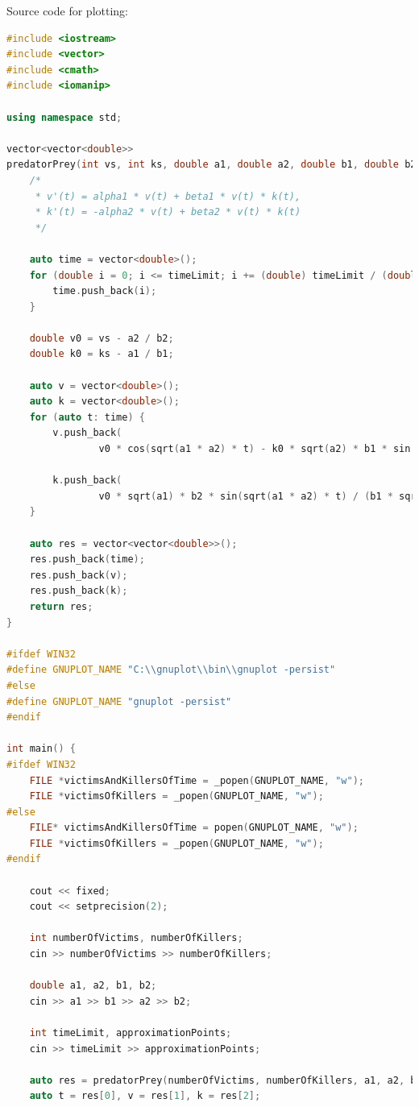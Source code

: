\documentclass{article}
\begin{document}
Source code for plotting: \\ 
\begin{lstlisting}[language=C++]
#include <iostream>
#include <vector>
#include <cmath>
#include <iomanip>

using namespace std;

vector<vector<double>>
predatorPrey(int vs, int ks, double a1, double a2, double b1, double b2, int timeLimit, int approximation) {
    /*
     * v'(t) = alpha1 * v(t) + beta1 * v(t) * k(t),
     * k'(t) = -alpha2 * v(t) + beta2 * v(t) * k(t)
     */

    auto time = vector<double>();
    for (double i = 0; i <= timeLimit; i += (double) timeLimit / (double) approximation) {
        time.push_back(i);
    }

    double v0 = vs - a2 / b2;
    double k0 = ks - a1 / b1;

    auto v = vector<double>();
    auto k = vector<double>();
    for (auto t: time) {
        v.push_back(
                v0 * cos(sqrt(a1 * a2) * t) - k0 * sqrt(a2) * b1 * sin(sqrt(a1 * a2) * t) / (b2 * sqrt(a1)) + a2 / b2);

        k.push_back(
                v0 * sqrt(a1) * b2 * sin(sqrt(a1 * a2) * t) / (b1 * sqrt(a2)) + k0 * cos(sqrt(a1 * a2) * t) + a1 / b1);
    }

    auto res = vector<vector<double>>();
    res.push_back(time);
    res.push_back(v);
    res.push_back(k);
    return res;
}

#ifdef WIN32
#define GNUPLOT_NAME "C:\\gnuplot\\bin\\gnuplot -persist"
#else
#define GNUPLOT_NAME "gnuplot -persist"
#endif

int main() {
#ifdef WIN32
    FILE *victimsAndKillersOfTime = _popen(GNUPLOT_NAME, "w");
    FILE *victimsOfKillers = _popen(GNUPLOT_NAME, "w");
#else
    FILE* victimsAndKillersOfTime = popen(GNUPLOT_NAME, "w");
    FILE *victimsOfKillers = _popen(GNUPLOT_NAME, "w");
#endif

    cout << fixed;
    cout << setprecision(2);

    int numberOfVictims, numberOfKillers;
    cin >> numberOfVictims >> numberOfKillers;

    double a1, a2, b1, b2;
    cin >> a1 >> b1 >> a2 >> b2;

    int timeLimit, approximationPoints;
    cin >> timeLimit >> approximationPoints;

    auto res = predatorPrey(numberOfVictims, numberOfKillers, a1, a2, b1, b2, timeLimit, approximationPoints);
    auto t = res[0], v = res[1], k = res[2];


\end{lstlisting}
\end{document}
